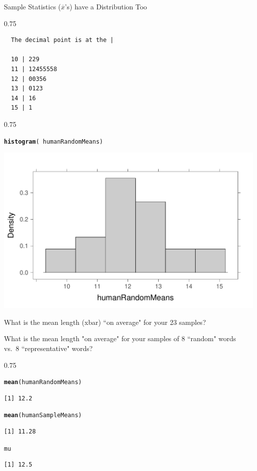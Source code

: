 \documentclass{beamer}\usepackage[]{graphicx}\usepackage[]{color}
\makeatletter
\newcommand{\hlopt}[1]{\textcolor[rgb]{0.102,0.102,0.102}{#1}}%
\newcommand{\hlstd}[1]{\textcolor[rgb]{0.102,0.102,0.102}{#1}}%
\newcommand{\hlkwd}[1]{\textcolor[rgb]{0.102,0.102,0.102}{\textbf{#1}}}%
\newenvironment{kframe}{%
 \def\at@end@of@kframe{}%
 \ifinner\ifhmode%
  \def\at@end@of@kframe{\end{minipage}}%
  \begin{minipage}{\columnwidth}%
 \fi\fi%
 \def\FrameCommand##1{\hskip\@totalleftmargin \hskip-\fboxsep
 \colorbox{shadecolor}{##1}\hskip-\fboxsep
     \hskip-\linewidth \hskip-\@totalleftmargin \hskip\columnwidth}%
 \MakeFramed {\advance\hsize-\width
   \@totalleftmargin\z@ \linewidth\hsize
   \@setminipage}}%
 {\par\unskip\endMakeFramed%
 \at@end@of@kframe}
\newenvironment{knitrout}{}{} %
\renewenvironment{knitrout}{\begin{spacing}{0.75}\begin{tiny}}{\end{tiny}\end{spacing}}
\newcommand{\xbar}{\overline{x}}
\makeatother
\begin{document}
\begin{frame}{Sample Statistics ($\xbar$'s) have a Distribution Too\;\;}
\begin{knitrout}
\begin{kframe}
\begin{verbatim}
  The decimal point is at the |

  10 | 229
  11 | 12455558
  12 | 00356
  13 | 0123
  14 | 16
  15 | 1
\end{verbatim}
\end{kframe}
\end{knitrout}

\newpage

\begin{knitrout}\small
{}\color{fgcolor}\begin{kframe}
\begin{alltt}
\hlkwd{histogram}\hlstd{(}\hlopt{~} \hlstd{humanRandomMeans)}
\end{alltt}
\end{kframe}

{\centering \includegraphics[width=0.79\linewidth]{figure/graphics-histogram-humanRandomMeans-1} 

}



\end{knitrout}
\newpage

What is the mean length (xbar) ``on average" for your 
23 samples?

What is the mean length "on average" for your samples of 8 ``random" words
vs.\ 8 ``representative" words?  
\begin{knitrout}\small
{}\color{fgcolor}\begin{kframe}
\begin{alltt}
\hlkwd{mean}\hlstd{(humanRandomMeans)}
\end{alltt}
\begin{verbatim}
[1] 12.2
\end{verbatim}
\begin{alltt}
\hlkwd{mean}\hlstd{(humanSampleMeans)}
\end{alltt}
\begin{verbatim}
[1] 11.28
\end{verbatim}
\begin{alltt}
\hlstd{mu}
\end{alltt}
\begin{verbatim}
[1] 12.5
\end{verbatim}
\end{kframe}
\end{knitrout}


\end{frame}
\end{document}
